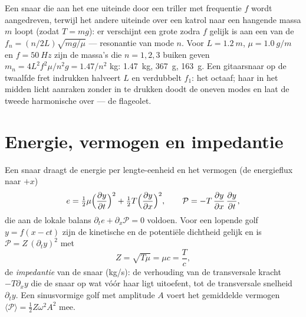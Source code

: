 \begin{example}\label{ex:b2:waves-on-strings:melde}
Een snaar die aan het ene uiteinde door een triller met frequentie $f$ wordt
aangedreven, terwijl het andere uiteinde over een katrol naar een hangende
massa $m$ loopt (zodat $T = mg$): er verschijnt een grote  zodra
$f$ gelijk is aan een van de $f_n = (n/2L)
\sqrt{mg/\mu}$ --- resonantie van
mode $n$. Voor $L = \qty{1.2}{m}$, $\mu =
\qty{1.0}{g/m}$ en
$f = \qty{50}{Hz}$ zijn de massa's die $n = 1, 2, 3$ buiken geven
$m_n = 4L^2f^2\mu/n^2g = 1.47/n^2$ kg: \qty{1.47}{kg}, \qty{367}{g},
\qty{163}{g}. Een gitaarsnaar op de twaalfde fret indrukken halveert $L$ en
verdubbelt $f_1$: het octaaf; haar in het midden licht aanraken zonder in te
drukken doodt de oneven modes en laat de tweede harmonische over --- de
flageolet.
\end{example}

\section{Energie, vermogen en impedantie}

\begin{proposition}\label{prop:b2:waves-on-strings:energy}
Een snaar draagt de energie per lengte-eenheid en het vermogen (de
energieflux naar $+x$)
\[
e = \tfrac12\mu\Bigl(\frac{\partial y}{\partial t}\Bigr)^2 + \tfrac12T\Bigl(\frac{\partial y}{\partial x}\Bigr)^2 ,
\qquad
\mathcal P = -T\,\frac{\partial y}{\partial x}\,\frac{\partial y}{\partial t} ,
\]
die aan de lokale balans $\partial_te + \partial_x\mathcal P = 0$ voldoen.
Voor een lopende golf $y = f(x - ct)$ zijn de kinetische en de potentiële
dichtheid gelijk en is $\mathcal P = Z\,(\partial_ty)^2$ met
\[
Z = \sqrt{T\mu} = \mu c = \frac Tc ,
\]
de \emph{impedantie} van de snaar (\unit{kg/s}): de verhouding van de
transversale kracht $-T\partial_xy$ die de snaar op wat vóór haar ligt
uitoefent, tot de transversale snelheid $\partial_ty$. Een sinusvormige golf
met amplitude $A$ voert het gemiddelde vermogen
$\langle\mathcal P\rangle = \tfrac12Z\omega^2A^2$ mee.
\end{proposition}


